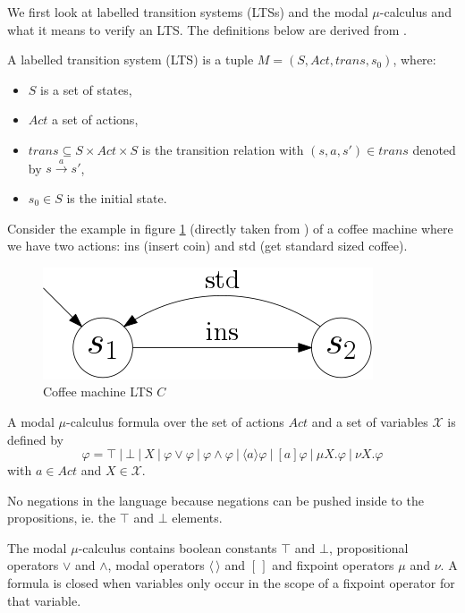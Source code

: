 We first look at labelled transition systems (LTSs) and the modal $\mu$-calculus and what it means to verify an LTS. The definitions below are derived from \cite{Groote}.
\begin{definition}
	\label{def_lts}A labelled transition system (LTS) is a tuple $M = (S, Act, trans, s_0)$, where:
	\begin{itemize}
		\item $S$ is a set of states,
		\item $Act$ a set of actions,
		\item $trans \subseteq S \times Act \times S$ is the transition relation with $(s,a,s') \in trans$ denoted by $s \xrightarrow a s'$,
		\item $s_0 \in S$ is the initial state.
	\end{itemize}
\end{definition}
Consider the example in figure \ref{fig:coffeemachinebasiceurolts} (directly taken from \cite{FamBasedModelCheckingWithMCRL2}) of a coffee machine where we have two actions: ins (insert coin) and std (get standard sized coffee).\\
\begin{figure}[h]
	\centering
	\includegraphics[scale=0.3]{Examples/CoffeeMachine/BasicEuroLTS}
	\caption[Coffee machine LTS]{Coffee machine LTS $C$}
	\label{fig:coffeemachinebasiceurolts}
\end{figure}


\begin{definition}
	\label{def_mu_syntax}
	A modal $\mu$-calculus formula over the set of actions $Act$ and a set of variables $\mathcal{X}$ is defined by
	\[ \varphi = \top\ |\ \bot\ |\ X\ |\ \varphi \vee \varphi\ |\ \varphi \wedge \varphi\ |\ \langle a \rangle \varphi\ |\ [a]\varphi\ |\ \mu X.\varphi\ |\ \nu X.\varphi \]
	with $a \in Act$ and $X \in \mathcal{X}$. 
	
	
	No negations in the language because negations can be pushed inside to the propositions, ie. the $\top$ and $\bot$ elements.
\end{definition}
The modal $\mu$-calculus contains boolean constants $\top$ and $\bot$, propositional operators $\vee$ and $\wedge$, modal operators $\langle \, \rangle$ and $[ \, ]$ and fixpoint operators $\mu$ and $\nu$. A formula is closed when variables only occur in the scope of a fixpoint operator for that variable.

